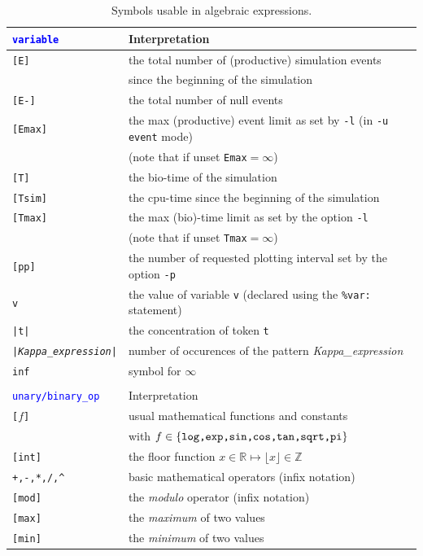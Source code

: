 \documentclass[11pt]{book}
\def\tcb#1{\textcolor{blue}{\ttt{#1}}}
\def\ttt#1{\texttt{#1}}
\def\var#1{{\textquotesingle}#1{\textquotesingle}}
\def\set#1{\{#1\}}
\def\Real{\mathbb R}
\def\Z{\mathbb Z}
\begin{document}
\begin{table}[htbp]
\centering
\caption{Symbols usable in algebraic expressions.%
}
\begin{tabular}{@{} l|l @{} }
\toprule
\ttt{\tcb{variable}} & Interpretation \\
\midrule
\ttt{[E]} & the total number of (productive) simulation events\index{event}\\
& since the beginning of the simulation \\
\ttt{[E-]} & the total number of null events\index{null event}\\
\ttt{[Emax]} & the max (productive) event limit as set by \ttt{-l} (in \ttt{-u event} mode) \\ &(note that if unset \ttt{Emax}$=\infty$)\\
\ttt{[T]} & the bio-time of the simulation \\
\ttt{[Tsim]} & the cpu-time since the beginning of the simulation \\
\ttt{[Tmax]} & the max (bio)-time limit as set by the option \ttt{-l} \\ &(note that if unset \ttt{Tmax}$=\infty$)\\
\ttt{[pp]} & the number of requested plotting interval set by the option \ttt{-p} \\

\ttt{\var{v}} & the value of variable \ttt{\var{v}} (declared using the \ttt{\%var:} statement) \\
\ttt{|t|} & the concentration of token \ttt{t}\\
\ttt{|\textit{Kappa\_expression}|} & number of occurences of the pattern \textit{Kappa\_expression}\\
\ttt{inf} & symbol for $\infty$ \\\\
\toprule
\ttt{\tcb{unary/binary\_op}} & Interpretation \\
\midrule
\ttt{[}$f$\texttt{]} & usual mathematical functions and constants \\ &with $f\in\set{\hbox{\ttt{log,exp,sin,cos,tan,sqrt,pi}}}$ \\
\ttt{[int]} & the floor function $x\in\Real\mapsto \lfloor x\rfloor\in\Z$ \\
\ttt{+,-,*,/,\textasciicircum} & basic mathematical operators (infix notation)\\
\ttt{[mod]} & the \emph{modulo} operator (infix notation)\\
\ttt{[max]} & the \emph{maximum} of two values \\
\ttt{[min]} & the \emph{minimum} of two values \\
\bottomrule
\end{tabular}
\label{tab:operators}
\end{table}
\end{document}
